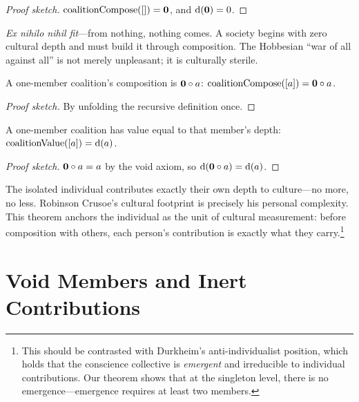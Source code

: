 \begin{proof}[Proof sketch]
$\operatorname{coalitionCompose}([]) = \mathbf{0}$, and $\operatorname{d}(\mathbf{0}) = 0$.
\end{proof}

\emph{Ex nihilo nihil fit}---from nothing, nothing comes.  A society begins
with zero cultural depth and must build it through composition.  The
Hobbesian ``war of all against all'' is not merely unpleasant; it is
culturally sterile.

\begin{theorem}
\label{thm:singleton-coal}
A one-member coalition's composition is $\mathbf{0} \circ a$:
$\operatorname{coalitionCompose}([a]) = \mathbf{0} \circ a$.
\end{theorem}

\begin{proof}[Proof sketch]
By unfolding the recursive definition once.
\end{proof}

\begin{theorem}
\label{thm:singleton-value}
A one-member coalition has value equal to that member's depth:
$\operatorname{coalitionValue}([a]) = \operatorname{d}(a)$.
\end{theorem}

\begin{proof}[Proof sketch]
$\mathbf{0} \circ a = a$ by the void axiom, so
$\operatorname{d}(\mathbf{0} \circ a) = \operatorname{d}(a)$.
\end{proof}

The isolated individual contributes exactly their own depth to culture---no
more, no less.  Robinson Crusoe's cultural footprint is precisely his personal
complexity.  This theorem anchors the individual as the unit of cultural
measurement: before composition with others, each person's contribution is
exactly what they carry.\footnote{This should be contrasted with Durkheim's
anti-individualist position, which holds that the conscience collective is
\emph{emergent} and irreducible to individual contributions.  Our theorem
shows that at the singleton level, there is no emergence---emergence
requires at least two members.}

\section{Void Members and Inert Contributions}
\label{sec:ch13-void}

